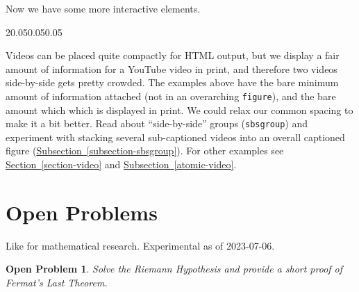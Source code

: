 \documentclass{sn-jnl}
\theoremstyle{thmstyleone}%
\theoremstyle{thmstyletwo}%
\newtheorem{openproblem}[theorem]{Open Problem}
\theoremstyle{thmstylethree}%
\newcommand{\xreffont}{\relax}
\newcommand{\mono}[1]{\texttt{#1}}
\numberwithin{equation}{section}
\begin{document}
Now we have some more interactive elements.%
\begin{sidebyside}{2}{0.05}{0.05}{0.05}%
\end{sidebyside}%
\par
Videos can be placed quite compactly for HTML output, but we display a fair amount of information for a YouTube video in print, and therefore two videos side-by-side gets pretty crowded.  The examples above have the bare minimum amount of information attached (not in an overarching \mono{figure}), and the bare amount which which is displayed in print.  We could relax our common spacing to make it a bit better.  Read about ``side-by-side'' groups (\mono{sbsgroup}) and experiment with stacking several sub-captioned videos into an overall captioned figure (\hyperref[subsection-sbsgroup]{Subsection~{\xreffont\ref{subsection-sbsgroup}}}).  For other examples see \hyperref[section-video]{Section~{\xreffont\ref{section-video}}} and \hyperref[atomic-video]{Subsection~{\xreffont\ref{atomic-video}}}.%
%
%
\typeout{************************************************}
\typeout{************************************************}
%
\section{Open Problems}\label{section-open-problems}%
Like for mathematical research.  Experimental as of 2023-07-06.%
\begin{openproblem}\label{section-open-problems-3}%
%
Solve the Riemann Hypothesis\footnotemark{} \emph{and} provide a short proof of Fermat's Last Theorem.%
\end{openproblem}
%
%
%
\typeout{************************************************}
\typeout{************************************************}
%
\end{document}

